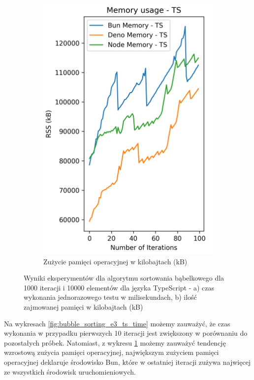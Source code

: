 \begin{figure}[H]
\begin{subfigure}[b]{0.44\textwidth}
  \end{subfigure}
  \begin{subfigure}[b]{0.44\textwidth}
    \centering
    \includegraphics[width=\textwidth]{Figures/sorting/sorting_bubble_100_10000_ts_memory.png}
    \caption{Zużycie pamięci operacyjnej w kilobajtach (kB)}
    \label{fig:bubble_sorting_e3_ts_memory}
  \end{subfigure}
  \caption{Wyniki eksperymentów dla algorytmu sortowania bąbelkowego dla 1000 iteracji i 10000 elementów dla języka TypeScript - a) czas wykonania jednorazowego testu w milisekundach, b) ilość zajmowanej pamięci w kilobajtach (kB)}
  \label{fig:bubble_sorting_e3_ts}
\end{figure}

Na wykresach \ref{fig:bubble_sorting_e3_ts_time} możemy zauważyć, że czas wykonania w przypadku pierwszych 10 iteracji jest zwiększony w porównaniu do pozostałych próbek. Natomiast, z wykresu \ref{fig:bubble_sorting_e3_ts_memory} możemy zauważyć tendencję wzrostową zużycia pamięci operacyjnej, największym zużyciem pamięci operacyjnej deklaruje środowisko Bun, które w ostatniej iteracji zużywa najwięcej ze wszystkich środowisk uruchomieniowych.

